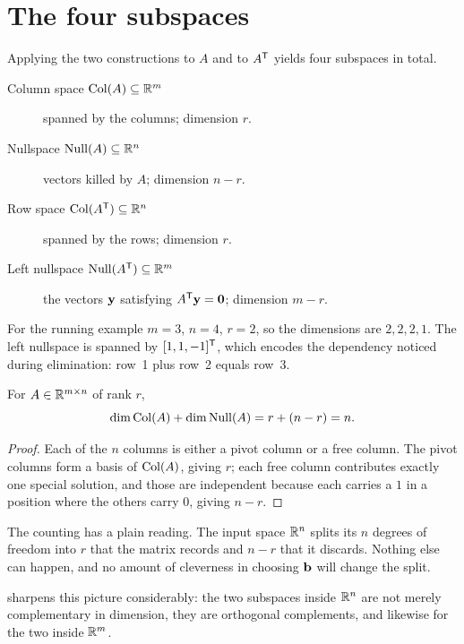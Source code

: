 \section{The four subspaces}

Applying the two constructions to \(A\) and to \(A^{\mathsf{T}}\) yields four subspaces in
total.

\begin{description}
	\item[Column space \(\operatorname{Col}(A)\subseteq\mathbb{R}^{m}\)] spanned by the columns;
	dimension \(r\).
	\item[Nullspace \(\operatorname{Null}(A)\subseteq\mathbb{R}^{n}\)] vectors killed by \(A\);
	dimension \(n-r\).
	\item[Row space \(\operatorname{Col}(A^{\mathsf{T}})\subseteq\mathbb{R}^{n}\)] spanned by the rows;
	dimension \(r\).
	\item[Left nullspace \(\operatorname{Null}(A^{\mathsf{T}})\subseteq\mathbb{R}^{m}\)] the vectors
	\(\mathbf{y}\) satisfying \(A^{\mathsf{T}}\mathbf{y}=\mathbf{0}\); dimension \(m-r\).
\end{description}

For the running example \(m=3\), \(n=4\), \(r=2\), so the dimensions are
\(2,2,2,1\). The left nullspace is spanned by \([1,1,-1]^{\mathsf{T}}\), which encodes the
dependency noticed during elimination: row~1 plus row~2 equals row~3.

\begin{theorem}
For \(A\in\mathbb{R}^{m\times n}\) of rank \(r\),
\[
	\dim\operatorname{Col}(A)+\dim\operatorname{Null}(A)=r+(n-r)=n .
\]
\end{theorem}

\begin{proof}
Each of the \(n\) columns is either a pivot column or a free column. The pivot
columns form a basis of \(\operatorname{Col}(A)\), giving \(r\); each free column contributes
exactly one special solution, and those are independent because each carries a
\(1\) in a position where the others carry \(0\), giving \(n-r\).
\end{proof}

\begin{remark}
The counting has a plain reading. The input space \(\mathbb{R}^{n}\) splits its \(n\)
degrees of freedom into \(r\) that the matrix records and \(n-r\) that it
discards. Nothing else can happen, and no amount of cleverness in choosing
\(\mathbf{b}\) will change the split.
\end{remark}

 sharpens this picture considerably: the two subspaces
inside \(\mathbb{R}^{n}\) are not merely complementary in dimension, they are orthogonal
complements, and likewise for the two inside \(\mathbb{R}^{m}\).
